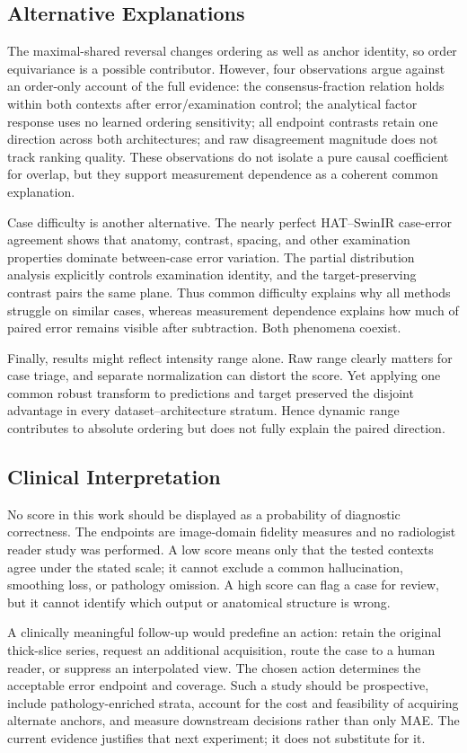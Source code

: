 \documentclass[journal,10pt]{IEEEtran}
\begin{document}
\subsection{Alternative Explanations}
The maximal-shared reversal changes ordering as well as anchor identity, so order equivariance is a possible contributor. However, four observations argue against an order-only account of the full evidence: the consensus-fraction relation holds within both contexts after error/examination control; the analytical factor response uses no learned ordering sensitivity; all endpoint contrasts retain one direction across both architectures; and raw disagreement magnitude does not track ranking quality. These observations do not isolate a pure causal coefficient for overlap, but they support measurement dependence as a coherent common explanation.

Case difficulty is another alternative. The nearly perfect HAT--SwinIR case-error agreement shows that anatomy, contrast, spacing, and other examination properties dominate between-case error variation. The partial distribution analysis explicitly controls examination identity, and the target-preserving contrast pairs the same plane. Thus common difficulty explains why all methods struggle on similar cases, whereas measurement dependence explains how much of paired error remains visible after subtraction. Both phenomena coexist.

Finally, results might reflect intensity range alone. Raw range clearly matters for case triage, and separate normalization can distort the score. Yet applying one common robust transform to predictions and target preserved the disjoint advantage in every dataset--architecture stratum. Hence dynamic range contributes to absolute ordering but does not fully explain the paired direction.

\subsection{Clinical Interpretation}
No score in this work should be displayed as a probability of diagnostic correctness. The endpoints are image-domain fidelity measures and no radiologist reader study was performed. A low score means only that the tested contexts agree under the stated scale; it cannot exclude a common hallucination, smoothing loss, or pathology omission. A high score can flag a case for review, but it cannot identify which output or anatomical structure is wrong.

A clinically meaningful follow-up would predefine an action: retain the original thick-slice series, request an additional acquisition, route the case to a human reader, or suppress an interpolated view. The chosen action determines the acceptable error endpoint and coverage. Such a study should be prospective, include pathology-enriched strata, account for the cost and feasibility of acquiring alternate anchors, and measure downstream decisions rather than only MAE. The current evidence justifies that next experiment; it does not substitute for it.
\end{document}
